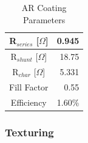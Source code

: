 \documentclass[letter,12pt]{article}
\begin{document}
			\begin{table}[h!]
				\centering
				\begin{tabular}{|c | r|}
					\hline
					R$_{series}$ [$\Omega$] & 0.945 \\
					\hline
					R$_{shunt}$ [$\Omega$] & 18.75 \\
					\hline
					R$_{char}$ [$\Omega$] & 5.331 \\
					\hline
					Fill Factor & 0.55 \\
					\hline
					Efficiency & 1.60\% \\
					\hline
				\end{tabular}
				\caption{AR Coating Parameters}
			\end{table}
		
		\pagebreak
		\FloatBarrier
		\subsubsection{Texturing}
		
\end{document}
